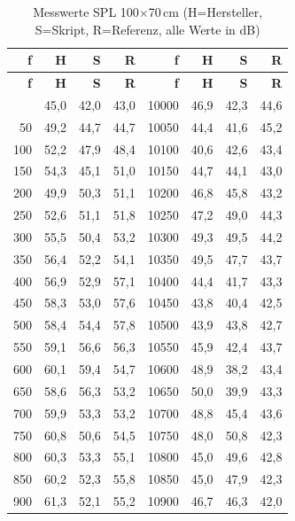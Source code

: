 \begin{small}
\setlength{\tabcolsep}{2pt}
\renewcommand{\arraystretch}{1.0}
\begin{longtable}{|r|r|r|r|r|r|r|r|}
\caption{Messwerte SPL 100$\times$70\,cm (H=Hersteller, S=Skript, R=Referenz, alle Werte in dB)} \\
\hline
\textbf{f} & \textbf{H} & \textbf{S} & \textbf{R} & \textbf{f} & \textbf{H} & \textbf{S} & \textbf{R} \\
\hline
\endfirsthead
\hline
\textbf{f} & \textbf{H} & \textbf{S} & \textbf{R} & \textbf{f} & \textbf{H} & \textbf{S} & \textbf{R} \\
\hline
\endhead
\hline
\endfoot
\hline
\endlastfoot
25 & 45,0 & 42,0 & 43,0 & 10000 & 46,9 & 42,3 & 44,6 \\ \hline
50 & 49,2 & 44,7 & 44,7 & 10050 & 44,4 & 41,6 & 45,2 \\ \hline
100 & 52,2 & 47,9 & 48,4 & 10100 & 40,6 & 42,6 & 43,4 \\ \hline
150 & 54,3 & 45,1 & 51,0 & 10150 & 44,7 & 44,1 & 43,0 \\ \hline
200 & 49,9 & 50,3 & 51,1 & 10200 & 46,8 & 45,8 & 43,2 \\ \hline
250 & 52,6 & 51,1 & 51,8 & 10250 & 47,2 & 49,0 & 44,3 \\ \hline
300 & 55,5 & 50,4 & 53,2 & 10300 & 49,3 & 49,5 & 44,2 \\ \hline
350 & 56,4 & 52,2 & 54,1 & 10350 & 49,5 & 47,7 & 43,7 \\ \hline
400 & 56,9 & 52,9 & 57,1 & 10400 & 44,4 & 41,7 & 43,3 \\ \hline
450 & 58,3 & 53,0 & 57,6 & 10450 & 43,8 & 40,4 & 42,5 \\ \hline
500 & 58,4 & 54,4 & 57,8 & 10500 & 43,9 & 43,8 & 42,7 \\ \hline
550 & 59,1 & 56,6 & 56,3 & 10550 & 45,9 & 42,4 & 43,7 \\ \hline
600 & 60,1 & 59,4 & 54,7 & 10600 & 48,9 & 38,2 & 43,4 \\ \hline
650 & 58,6 & 56,3 & 53,2 & 10650 & 50,0 & 39,9 & 43,3 \\ \hline
700 & 59,9 & 53,3 & 53,2 & 10700 & 48,8 & 45,4 & 43,6 \\ \hline
750 & 60,8 & 50,6 & 54,5 & 10750 & 48,0 & 50,8 & 42,3 \\ \hline
800 & 60,3 & 53,3 & 55,1 & 10800 & 45,0 & 49,6 & 42,8 \\ \hline
850 & 60,2 & 52,3 & 55,8 & 10850 & 45,0 & 47,9 & 42,3 \\ \hline
900 & 61,3 & 52,1 & 55,2 & 10900 & 46,7 & 46,3 & 42,0 \\ \hline

\end{longtable}
\end{small}
